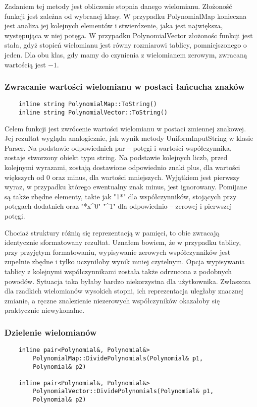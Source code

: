\documentclass[oneside,a4paper]{book}
\begin{document}
	Zadaniem tej metody jest obliczenie stopnia danego wielomianu. Złożoność funkcji jest zależna od wybranej klasy. W przypadku PolynomialMap konieczna jest analiza jej kolejnych elementów i stwierdzenie, jaka jest największa, występująca w niej potęga. W przypadku PolynomialVector złożonośc funkcji jest stała, gdyż stopień wielomianu jest równy rozmiarowi tablicy, pomniejszonego o jeden. Dla obu klas, gdy mamy do czynienia z wielomianem zerowym, zwracaną wartością jest $-1$.
	
	\subsubsection{Zwracanie wartości wielomianu w postaci łańcucha znaków}
	\begin{lstlisting}
	inline string PolynomialMap::ToString()
	inline string PolynomialVector::ToString()
	\end{lstlisting}
	
	Celem funkcji jest zwrócenie wartości wielomianu w postaci zmiennej znakowej. Jej rezultat wygląda analogicznie, jak wynik metody UniformInputString w klasie Parser. Na podstawie odpowiednich par – potęgi i wartości współczynnika, zostaje stworzony obiekt typu string. Na podstawie kolejnych liczb, przed kolejnymi wyrazami, zostają dostawione odpowiednio znaki plus, dla wartości większych od $0$ oraz minus, dla wartości mniejszych. Wyjątkiem jest pierwszy wyraz, w przypadku którego ewentualny znak minus, jest ignorowany. Pomijane są także zbędne elementy, takie jak "1*" dla współczynników, stojących przy potęgach dodatnich oraz "*x\^{}0" "\^{}1" dla odpowiednio – zerowej i pierwszej potęgi.
	
	Chociaż struktury różnią się reprezentacją w pamięci, to obie zwracają identycznie sformatowany rezultat. Uznałem bowiem, że w przypadku tablicy, przy przyjętym formatowaniu, wypisywanie zerowych współczynników jest zupełnie zbędne i tylko uczyniłoby wynik mniej czytelnym. Opcja wypisywania tablicy z kolejnymi współczynnikami została także odrzucona z podobnych powodów. Sytuacja taka byłaby bardzo niekorzystna dla użytkownika. Zwłaszcza dla rzadkich wielomianów wysokich stopni, ich reprezentacja uległaby znacznej zmianie, a ręczne znalezienie niezerowych współczyników okazałoby się praktycznie niewykonalne.
	
	\subsubsection{Dzielenie wielomianów}
	\begin{lstlisting}
	inline pair<Polynomial&, Polynomial&>
	    PolynomialMap::DividePolynomials(Polynomial& p1,
	    Polynomial& p2)
	
	inline pair<Polynomial&, Polynomial&>
	    PolynomialVector::DividePolynomials(Polynomial& p1,
	    Polynomial& p2)
	\end{lstlisting}
	
\end{document}
